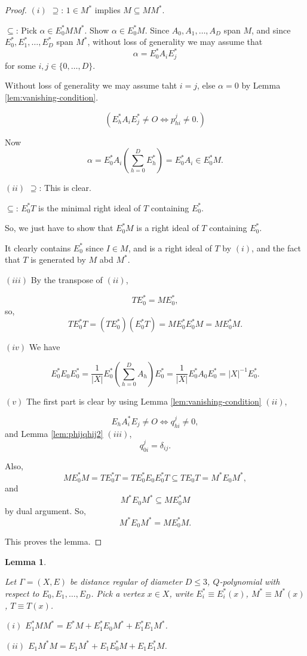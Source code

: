 \documentclass[
]{book}
\newtheorem{lemma}{Lemma}[chapter]
\theoremstyle{definition}
\theoremstyle{definition}
\theoremstyle{definition}
\theoremstyle{definition}
\theoremstyle{remark}
\begin{document}
\begin{proof}
\leavevmode

\((i)\) \(\supseteq\): \(1\in M^*\) implies \(M\subseteq MM^*\).

\(\subseteq\): Pick \(\alpha\in E^*_0MM^*\). Show \(\alpha\in E^*_0M\). Since \(A_0, A_1, \ldots, A_D\) span \(M\), and since \(E^*_0, E^*_1, \ldots, E^*_D\) span \(M^*\), without loss of generality we may assume that
\[\alpha = E^*_0A_iE^*_j\]
for some \(i,j\in \{0, \ldots, D\}\).

Without loss of generality we may assume taht \(i = j\), else \(\alpha = 0\) by Lemma \ref{lem:vanishing-condition}.

\[(E^*_hA_iE^*_j \neq O \Leftrightarrow p^j_{hi}\neq 0.)\]

Now
\[\alpha = E^*_0A_i\left(\sum_{h=0}^D E^*_h\right) = E^*_0A_i \in E^*_0M.\]

\((ii)\) \(\supseteq\): This is clear.

\(\subseteq\): \(E^*_0T\) is the minimal right ideal of \(T\) containing \(E^*_0\).

So, we just have to show that \(E^*_0M\) is a right ideal of \(T\) containing \(E^*_0\).

It clearly contains \(E^*_0\) since \(I\in M\), and is a right ideal of \(T\) by \((i)\), and the fact that \(T\) is generated by \(M\) abd \(M^*\).

\((iii)\) By the transpose of \((ii)\),

\[TE^*_0 = ME^*_0,\]
so,
\[TE^*_0T = (TE^*_0)(E^*_0T) = ME^*_0E^*_0M = ME^*_0M.\]

\((iv)\) We have

\[E^*_0E_0E^*_0 = \frac{1}{|X|}E^*_0\left(\sum_{h=0}^D A_h\right)E^*_0 = \frac{1}{|X|}E^*_0A_0E^*_0 = |X|^{-1}E^*_0.\]

\((v)\) The first part is clear by using Lemma \ref{lem:vanishing-condition} \((ii)\),

\[E_hA^*_iE_j\neq O \Leftrightarrow q^j_{hi} \neq 0,\]
and Lemma \ref{lem:phijqhij2} \((iii)\),
\[q^j_{0i} = \delta_{ij}.\]

Also,
\[ME^*_0M = TE^*_0T = TE^*_0E_0E^*_0T \subseteq TE_0T = M^*E_0M^*,\]
and
\[M^*E_0M^* \subseteq ME^*_0M\]
by dual argument.
So,
\[M^*E_0M^* = ME^*_0M.\]

This proves the lemma.

\end{proof}

\begin{lemma}
\protect\hypertarget{lem:eonemmstar}{}\label{lem:eonemmstar}

Let \(\Gamma = (X, E)\) be distance regular of diameter \(D\leq 3\), \(Q\)-polynomial with respect to \(E_0, E_1, \ldots, E_D\). Pick a vertex \(x\in X\),
write \(E^*_i\equiv E^*_i(x)\), \(M^* \equiv M^*(x)\), \(T\equiv T(x)\).

\((i)\) \(E^*_1MM^* = E^*M + E^*_1E_0M^* + E^*_1E_1M^*\).

\((ii)\) \(E_1M^*M = E_1M^* + E_1E^*_0M + E_1E^*_1M\).

\end{lemma}
\end{document}
